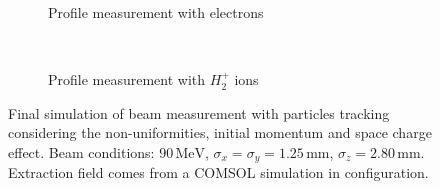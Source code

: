 \begin{figure}[!ht]
	\begin{subfigure}[t]{0.5\textwidth}
		
		\caption{Profile measurement with electrons}
		\label{}
	\end{subfigure}
	~
	\begin{subfigure}[t]{0.5\textwidth}
		
		\caption{Profile measurement with $H^{+}_{2}$ ions}
		\label{}
	\end{subfigure}
  \caption[Final simulation of beam measurement with particles tracking considering the non-uniformities, initial momentum and space charge effect.]{Final simulation of beam measurement with particles tracking considering the non-uniformities, initial momentum and space charge effect. Beam conditions: $90\,\mathrm{MeV}$, $\sigma_{x}=\sigma_{y}=1.25\,\mathrm{mm}$, $\sigma_{z} = 2.80\,\mathrm{mm}$. Extraction field comes from a COMSOL simulation in configuration.}
	\label{chap:}
\end{figure}
